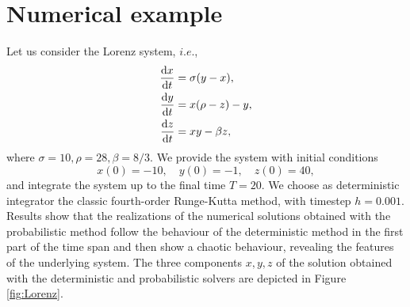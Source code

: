 \section{Numerical example}

Let us consider the Lorenz system, $i.e.$,
\begin{align}
	\dv{x}{t} &= \sigma(y - x), \\
	\dv{y}{t} &= x(\rho - z) - y, \\
	\dv{z}{t} &= xy - \beta z,
\end{align}
where $\sigma = 10, \rho = 28, \beta = 8/3$. We provide the system with initial conditions
\begin{equation}
	x(0) = -10, \quad y(0) = -1, \quad z(0) = 40, 
\end{equation}
and integrate the system up to the final time $T = 20$. We choose as deterministic integrator the classic fourth-order Runge-Kutta method, with timestep $h = 0.001$. Results show that the realizations of the numerical solutions obtained with the probabilistic method follow the behaviour of the deterministic method in the first part of the time span and then show a chaotic behaviour, revealing the features of the underlying system. The three components $x, y, z$ of the solution obtained with the deterministic and probabilistic solvers are depicted in Figure \ref{fig:Lorenz}. 

